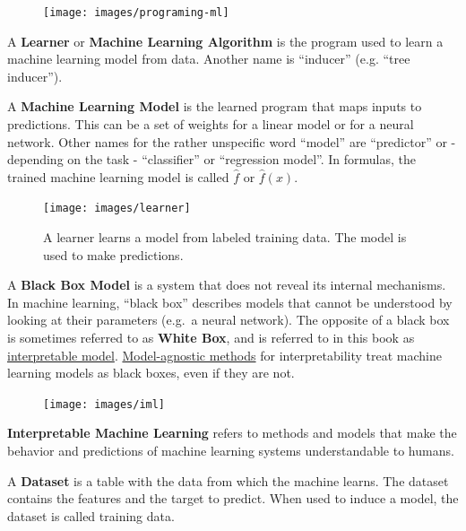\documentclass[12pt,]{krantz}
\begin{document}
\begin{figure}

{\centering \texttt{[image: images/programing-ml]} 

}

\end{figure}

A \textbf{Learner} or \textbf{Machine Learning Algorithm} is the program
used to learn a machine learning model from data. Another name is
``inducer'' (e.g. ``tree inducer'').

A \textbf{Machine Learning Model} is the learned program that maps
inputs to predictions. This can be a set of weights for a linear model
or for a neural network. Other names for the rather unspecific word
``model'' are ``predictor'' or - depending on the task - ``classifier''
or ``regression model''. In formulas, the trained machine learning model
is called \(\hat{f}\) or \(\hat{f}(x)\).

\begin{figure}

{\centering \texttt{[image: images/learner]} 

}

\caption{A learner learns a model from labeled training data. The model is used to make predictions.}\label{fig:learner-definition}
\end{figure}

A \textbf{Black Box Model} is a system that does not reveal its internal
mechanisms. In machine learning, ``black box'' describes models that
cannot be understood by looking at their parameters (e.g.~a neural
network). The opposite of a black box is sometimes referred to as
\textbf{White Box}, and is referred to in this book as
\protect\hyperlink{simple}{interpretable model}.
\protect\hyperlink{agnostic}{Model-agnostic methods} for
interpretability treat machine learning models as black boxes, even if
they are not.

\begin{figure}

{\centering \texttt{[image: images/iml]} 

}

\end{figure}

\textbf{Interpretable Machine Learning} refers to methods and models
that make the behavior and predictions of machine learning systems
understandable to humans.

A \textbf{Dataset} is a table with the data from which the machine
learns. The dataset contains the features and the target to predict.
When used to induce a model, the dataset is called training data.
\end{document}
